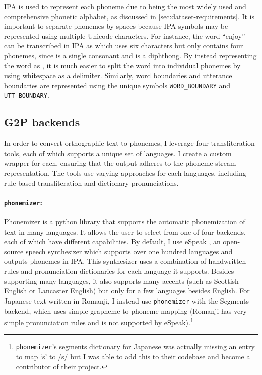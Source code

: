 IPA is used to represent each phoneme due to being the most widely used and comprehensive phonetic alphabet, as discussed in \cref{sec:dataset-requirements}. It is important to separate phonemes by spaces because IPA symbols may be represented using multiple Unicode characters. For instance, the word ``enjoy'' can be transcribed in IPA as  which uses six characters but only contains four phonemes, since  is a single consonant and  is a diphthong. By instead representing the word as , it is much easier to split the word into individual phonemes by using whitespace as a delimiter. Similarly, word boundaries and utterance boundaries are represented using the unique symbols \texttt{WORD\_BOUNDARY} and \texttt{UTT\_BOUNDARY}. 

\subsection{G2P backends}
\label{sec:dataset-transliteration-tool-backends}

In order to convert orthographic text to phonemes, I leverage four transliteration tools, each of which supports a unique set of languages. I create a custom wrapper for each, ensuring that the output adheres to the phoneme stream representation. The tools use varying approaches for each languages, including rule-based transliteration and dictionary pronunciations.

\paragraph{\texttt{phonemizer}:}
Phonemizer \citep{Bernard2021} is a python library that supports the automatic phonemization of text in many languages. It allows the user to select from one of four backends, each of which have different capabilities. By default, I use eSpeak \citep{Dunn2019}, an open-source speech synthesizer which supports over one hundred languages and outputs phonemes in IPA. This synthesizer uses a combination of handwritten rules and pronunciation dictionaries for each language it supports. Besides supporting many languages, it also supports many accents (such as Scottish English or Lancaster English) but only for a few languages besides English. For Japanese text written in Romanji, I instead use \texttt{phonemizer} with the Segments \citep{robert_forkel_2019_3549784} backend, which uses simple grapheme to phoneme mapping (Romanji has very simple pronunciation rules and is not supported by eSpeak).\footnote{\texttt{phonemizer}'s segments dictionary for Japanese was actually missing an entry to map `s' to /s/ but I was able to add this to their codebase and become a contributor of their project.}

